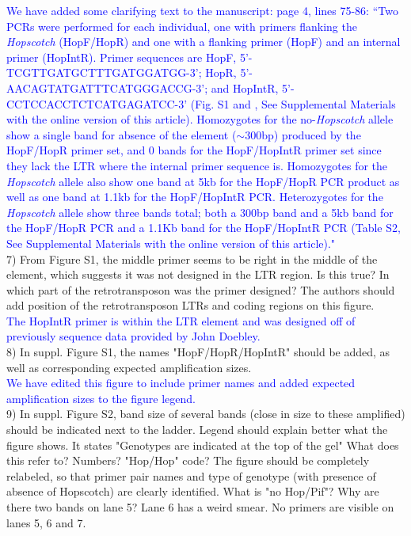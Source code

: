 \documentclass[11pt]{article}
\newcommand{\res}[1]{\noindent \textcolor{blue}{{#1}} \\}
\begin{document}
\res{We have added some clarifying text to the manuscript: page 4, lines 75-86: ``Two PCRs were performed for each individual, one with primers flanking the \emph{Hopscotch} (HopF/HopR) and one with a flanking primer (HopF) and an internal primer (HopIntR). Primer sequences are HopF, {\small 5'-TCGTTGATGCTTTGATGGATGG-3'}; 
HopR, {\small 5'-AACAGTATGATTTCATGGGACCG-3'}; and HopIntR, {\small  5'-CCTCCACCTCTCATGAGATCC-3'} (Fig. S1 and \track{\ref{Fig1Cartoon}}, See Supplemental Materials with the online version of this article). Homozygotes for the no-\emph{Hopscotch} allele show a single band for absence of the element ($\sim$300bp) produced by the HopF/HopR primer set, and 0 bands for the HopF/HopIntR primer set since they lack the LTR where the internal primer sequence is. Homozygotes for the \emph{Hopscotch} allele also show one band at 5kb for the HopF/HopR PCR product as well as one band at 1.1kb for the HopF/HopIntR PCR. Heterozygotes for the \emph{Hopscotch} allele show three bands total; both a 300bp band and a 5kb band for the HopF/HopR PCR and a 1.1Kb band for the HopF/HopIntR PCR (Table S2, See Supplemental Materials with the online version of this article)."}





7) From Figure S1, the middle primer seems to be right in the middle of the element, which suggests it was not designed in the LTR region. Is this true? In which part of the retrotransposon was the primer designed? The authors should add position of the retrotransposon LTRs and coding regions on this figure. \\

\res{The HopIntR primer is within the LTR element and was designed off of previously sequence data provided by John Doebley.}

8) In suppl. Figure S1, the names "HopF/HopR/HopIntR" should be added, as well as corresponding expected amplification sizes.\\

\res{We have edited this figure to include primer names and added expected amplification sizes to the figure legend.}

9) In suppl. Figure S2, band size of several bands (close in size to these amplified) should be indicated next to the ladder. Legend should explain better what the figure shows. It states "Genotypes are indicated at the top of the gel" What does this refer to? Numbers? "Hop/Hop" code? The figure should be completely relabeled, so that primer pair names and type of genotype (with presence of absence of Hopscotch) are clearly identified. What is "no Hop/Pif"? Why are there two bands on lane 5? Lane 6 has a weird smear. No primers are visible on lanes 5, 6 and 7.\\
\end{document}
